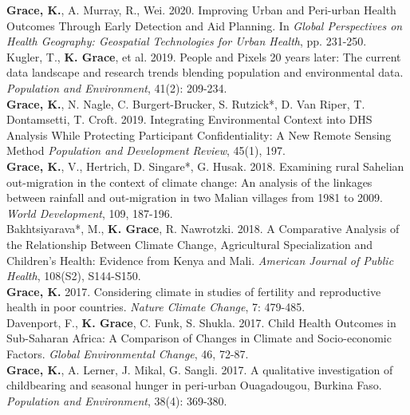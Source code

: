 \documentclass[11pt]{article} %
\begin{document}
\noindent
\textbf{Grace, K.}, A. Murray, R., Wei. 2020. Improving Urban and Peri-urban Health Outcomes Through Early Detection and Aid Planning.  In \textit{Global Perspectives on Health Geography: Geospatial Technologies for Urban Health}, pp. 231-250.\\

\noindent
Kugler, T., \textbf{K. Grace}, et al. 2019. People and Pixels 20 years later: The current data landscape and research trends blending population and environmental data. \textit{Population and Environment}, 41(2): 209-234.\\

\noindent
\textbf{Grace, K.}, N. Nagle, C. Burgert-Brucker, S. Rutzick*, D. Van Riper, T. Dontamsetti, T. Croft. 2019.  Integrating Environmental Context into DHS Analysis While Protecting Participant Confidentiality: A New Remote Sensing Method \textit{Population and Development Review}, 45(1), 197.\\

\noindent
\textbf{Grace, K.}, V., Hertrich, D. Singare*, G. Husak. 2018. Examining rural Sahelian out-migration in the context of climate change: An analysis of the linkages between rainfall and out-migration in two Malian villages from 1981 to 2009. \textit {World Development}, 109, 187-196.\\

\noindent
Bakhtsiyarava*, M., \textbf{K. Grace}, R. Nawrotzki. 2018. A Comparative Analysis of the Relationship Between Climate Change, Agricultural Specialization and Children's Health: Evidence from Kenya and Mali. \textit {American Journal of Public Health}, 108(S2), S144-S150.\\

\noindent
\textbf{Grace, K.} 2017. Considering climate in studies of fertility and reproductive health in poor countries. \textit{Nature Climate Change},  7: 479-485.\\

\noindent
Davenport, F.,  \textbf{K. Grace}, C. Funk, S. Shukla. 2017. Child Health Outcomes in Sub-Saharan Africa: A Comparison of Changes in Climate and Socio-economic Factors. \textit{Global Environmental Change}, 46, 72-87.\\

\noindent
\textbf{Grace, K.}, A. Lerner, J. Mikal, G. Sangli. 2017. A qualitative investigation of childbearing and seasonal hunger in peri-urban Ouagadougou, Burkina Faso.  \textit{Population and Environment}, 38(4): 369-380.\\
\end{document}
